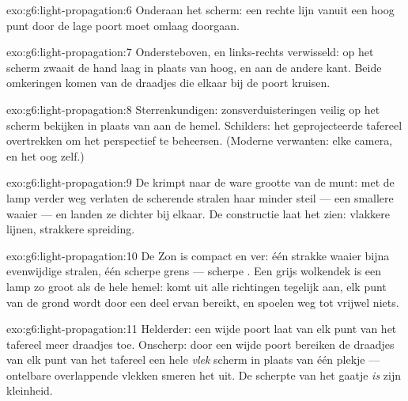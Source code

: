 \begin{solution}{exo:g6:light-propagation:6}
Onderaan het scherm: een rechte lijn vanuit een hoog punt door de lage
poort moet omlaag doorgaan.
\end{solution}

\begin{solution}{exo:g6:light-propagation:7}
Ondersteboven, en links-rechts verwisseld: op het scherm zwaait de
hand laag in plaats van hoog, en aan de andere kant. Beide omkeringen
komen van de draadjes die elkaar bij de poort kruisen.
\end{solution}

\begin{solution}{exo:g6:light-propagation:8}
Sterrenkundigen: zonsverduisteringen veilig op het scherm bekijken in
plaats van aan de hemel. Schilders: het geprojecteerde tafereel
overtrekken om het perspectief te beheersen. (Moderne verwanten: elke
camera, en het oog zelf.)
\end{solution}

\begin{solution}{exo:g6:light-propagation:9}
De  krimpt naar de ware grootte van de munt: met de lamp
verder weg verlaten de scherende stralen haar minder steil --- een
smallere waaier --- en landen ze dichter bij elkaar. De constructie
laat het zien: vlakkere lijnen, strakkere spreiding.
\end{solution}

\begin{solution}{exo:g6:light-propagation:10}
De Zon is compact en ver: één strakke waaier bijna evenwijdige
stralen, één scherpe grens --- scherpe . Een grijs
wolkendek is een lamp zo groot als de hele hemel:  komt uit
alle richtingen tegelijk aan, elk punt van de grond wordt door een
deel ervan bereikt, en  spoelen weg tot vrijwel niets.
\end{solution}

\begin{solution}{exo:g6:light-propagation:11}
Helderder: een wijde poort laat van elk punt van het tafereel meer
draadjes toe. Onscherp: door een wijde poort bereiken de draadjes van
elk punt van het tafereel een hele \emph{vlek} scherm in plaats van
één plekje --- ontelbare overlappende vlekken smeren het  uit. De
scherpte van het gaatje \emph{is} zijn kleinheid.
\end{solution}

